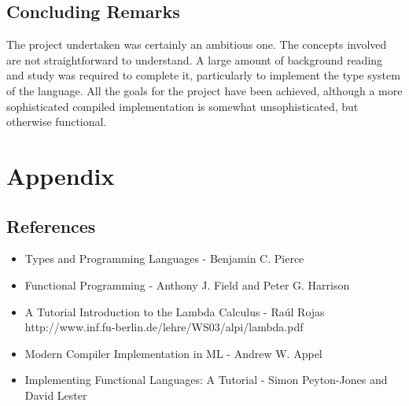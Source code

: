 \documentclass{article}
\begin{document}
\subsection{Concluding Remarks}
The project undertaken was certainly an ambitious one. The concepts involved are not straightforward to understand. A large amount of background reading and study was required to complete it, particularly to implement the type system of the language. All the goals for the project have been achieved, although a more sophisticated compiled implementation is somewhat unsophisticated, but otherwise functional.

\pagebreak
\section{Appendix}
\subsection{References}
\begin{itemize}
    \item Types and Programming Languages - Benjamin C. Pierce
    \item Functional Programming - Anthony J. Field and Peter G. Harrison
    \item A Tutorial Introduction to the Lambda Calculus - Ra\'{u}l Rojas \\
        http://www.inf.fu-berlin.de/lehre/WS03/alpi/lambda.pdf
    \item Modern Compiler Implementation in ML - Andrew W. Appel
    \item Implementing Functional Languages: A Tutorial - Simon Peyton-Jones and David Lester
\end{itemize}
\end{document}
